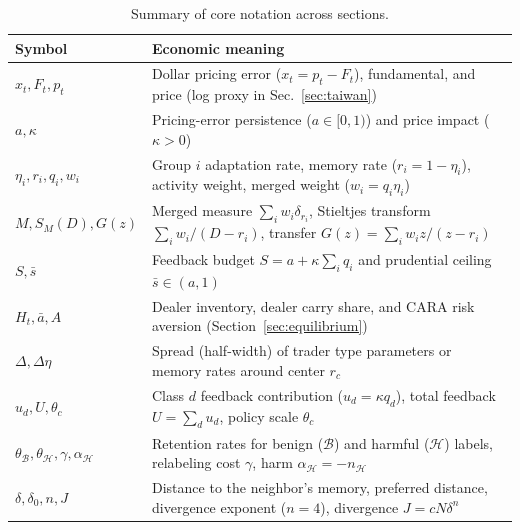 \documentclass[11pt,letterpaper]{article}
\theoremstyle{definition}
\begin{document}
\begin{table}[!htbp]
\centering
\caption{Summary of core notation across sections.}
\label{tab:notation}
\small
\begin{tabularx}{\linewidth}{@{}lX@{}}
\toprule
Symbol & Economic meaning \\
\midrule
$x_t, F_t, p_t$ & Dollar pricing error ($x_t = p_t - F_t$), fundamental, and price (log proxy in Sec.~\ref{sec:taiwan}) \\
$a, \kappa$ & Pricing-error persistence ($a \in [0,1)$) and price impact ($\kappa > 0$) \\
$\eta_i, r_i, q_i, w_i$ & Group $i$ adaptation rate, memory rate ($r_i = 1-\eta_i$), activity weight, merged weight ($w_i = q_i \eta_i$) \\
$M, S_M(D), G(z)$ & Merged measure $\sum_i w_i \delta_{r_i}$, Stieltjes transform $\sum_i w_i/(D - r_i)$, transfer $G(z) = \sum_i w_i z/(z - r_i)$ \\
$S, \bar{s}$ & Feedback budget $S = a + \kappa \sum_i q_i$ and prudential ceiling $\bar{s} \in (a, 1)$ \\
$H_t, \bar{a}, A$ & Dealer inventory, dealer carry share, and CARA risk aversion (Section~\ref{sec:equilibrium}) \\
$\Delta, \Delta\eta$ & Spread (half-width) of trader type parameters or memory rates around center $r_c$ \\
$u_d, U, \theta_c$ & Class $d$ feedback contribution ($u_d = \kappa q_d$), total feedback $U = \sum_d u_d$, policy scale $\theta_c$ \\
$\theta_{\mathcal{B}}, \theta_{\mathcal{H}}, \gamma, \alpha_{\mathcal{H}}$ & Retention rates for benign ($\mathcal{B}$) and harmful ($\mathcal{H}$) labels, relabeling cost $\gamma$, harm $\alpha_{\mathcal{H}} = -n_{\mathcal{H}}$ \\
$\delta, \delta_0, n, J$ & Distance to the neighbor's memory, preferred distance, divergence exponent ($n = 4$), divergence $J = cN\delta^n$ \\
\bottomrule
\end{tabularx}
\end{table}
\end{document}
